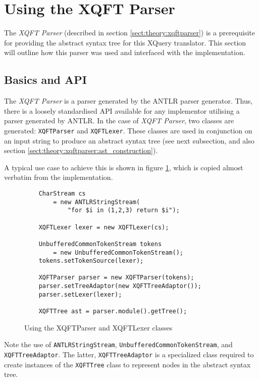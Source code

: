 \section{Using the XQFT Parser}
The \textit{XQFT Parser}\cite{ourselves} (described in section
\ref{sect:theory:xqftparser}) is a prerequisite for providing the abstract
syntax tree for this XQuery translator. This section will outline how this
parser was used and interfaced with the implementation.

\subsection{Basics and API}
The \textit{XQFT Parser} is a parser generated by the ANTLR parser generator.
Thus, there is a loosely standardised API available for any implementor
utilising a parser generated by ANTLR. In the case of \textit{XQFT Parser}, two
classes are generated: \texttt{XQFTParser} and \texttt{XQFTLexer}. These
classes are used in conjunction on an input string to produce an abstract syntax
tree (see next subsection, and also section
\ref{sect:theory:xqftparser:ast_construction}).

A typical use case to achieve this is shown in figure
\ref{figure:impl:using_xqft}, which is copied almost verbatim from the
implementation.

\begin{figure}[!htp]
\begin{center}
  \begin{Verbatim}
    CharStream cs 
        = new ANTLRStringStream(
            "for $i in (1,2,3) return $i");

    XQFTLexer lexer = new XQFTLexer(cs);

    UnbufferedCommonTokenStream tokens 
        = new UnbufferedCommonTokenStream();
	tokens.setTokenSource(lexer);

    XQFTParser parser = new XQFTParser(tokens);
    parser.setTreeAdaptor(new XQFTTreeAdaptor());
    parser.setLexer(lexer);

    XQFTTree ast = parser.module().getTree();
  \end{Verbatim}
  \caption{Using the XQFTParser and XQFTLexer classes}
  \label{figure:impl:using_xqft}
\end{center}
\end{figure}
Note the use of \texttt{ANTLRStringStream},
\texttt{UnbufferedCommonTokenStream}, and \texttt{XQFTTreeAdaptor}. The latter,
\texttt{XQFTTreeAdaptor} is a specialized class required to create instances of
the \texttt{XQFTTree} class to represent nodes in the abstract syntax tree.

